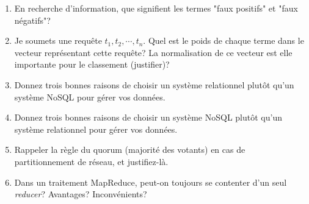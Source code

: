 \documentclass[11pt,a4paper]{article}
\begin{document}
\begin{enumerate}

  \item En recherche d'information, que signifient les termes "faux positifs"
      et "faux négatifs"?


\item Je soumets une requête $t_1, t_2, \cdots, t_n$. 
    Quel est le poids de chaque terme dans le vecteur représentant cette requête? 
    La normalisation de ce vecteur est elle importante pour le classement (justifier)?
    
  \item Donnez trois bonnes raisons de choisir un système relationnel plutôt
      qu'un système NoSQL pour gérer vos données.

  \item Donnez trois bonnes raisons de choisir un système NoSQL plutôt
      qu'un système relationnel pour gérer vos données.
  
  \item Rappeler la règle du quorum 
      (majorité des votants) en cas de partitionnement de réseau, et justifiez-là.

  \item Dans un traitement MapReduce, peut-on toujours se contenter d'un seul
     \textit{reducer}? Avantages? Inconvénients?
      
\end{enumerate}
\end{document}
